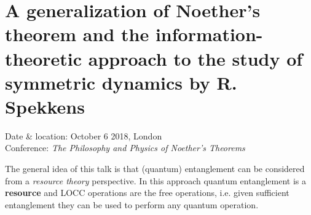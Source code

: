 \section{A generalization of Noether's theorem and the information-theoretic approach to the study of symmetric dynamics by R. Spekkens}

    Date \& location: October 6 2018, London\\
    Conference: \textit{The Philosophy and Physics of Noether's Theorems}

    The general idea of this talk is that (quantum) entanglement can be considered from a \textit{resource theory} perspective. In this approach quantum entanglement is a \textbf{resource} and LOCC operations are the free operations, i.e. given sufficient entanglement they can be used to perform any quantum operation.